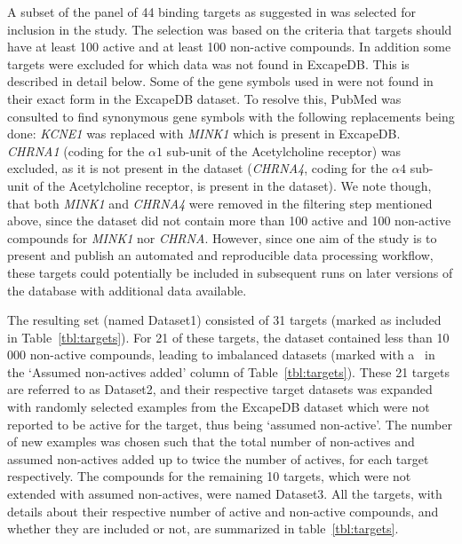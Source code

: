 \documentclass[10pt,article]{memoir}
\begin{document}
A subset of the panel of 44 binding targets as suggested in \cite{Bowes2012}
was selected for inclusion in the study. The selection was based on the
criteria that targets should have at least 100 active and at least 100
non-active compounds.  In addition some targets were excluded for which data
was not found in ExcapeDB. This is described in detail below.
%
Some of the gene symbols used in \cite{Bowes2012} were not found in their exact
form in the ExcapeDB dataset. To resolve this, PubMed was consulted to find
synonymous gene symbols with the following replacements being done:
%
\textit{KCNE1} was replaced with \textit{MINK1} which is present in ExcapeDB.
\textit{CHRNA1} (coding for the $\alpha1$ sub-unit of the Acetylcholine
receptor) was excluded, as it is not present in the dataset (\textit{CHRNA4},
coding for the $\alpha4$ sub-unit of the Acetylcholine receptor, is present in
the dataset). We note though, that both \textit{MINK1} and \textit{CHRNA4} were removed
in the filtering step mentioned above, since the dataset did not contain more
than 100 active and 100 non-active compounds for \textit{MINK1} nor
\textit{CHRNA}.  However, since one aim of the study is to present and publish
an automated and reproducible data processing workflow, these targets could
potentially be included in subsequent runs on later versions of the database
with additional data available.

The resulting set (named Dataset1) consisted of 31 targets (marked as included in
Table~\ref{tbl:targets}). For 21 of these targets, the dataset contained less
than 10\,000 non-active compounds, leading to imbalanced datasets (marked with
a \checkmark\ in the `Assumed non-actives added' column of Table~\ref{tbl:targets}).
These 21 targets are referred to as Dataset2, and their respective target datasets was expanded with randomly
selected examples from the ExcapeDB dataset which were not reported to be active for
the target, thus being `assumed non-active'. The number of new examples was chosen such that the total
number of non-actives and assumed non-actives added up to twice the number of
actives, for each target respectively. The compounds for the remaining 10 targets, which were not extended with
assumed non-actives, were named Dataset3.
%
All the targets, with details about their respective number of active and
non-active compounds, and whether they are included or not, are summarized in
table~\ref{tbl:targets}.
\end{document}

